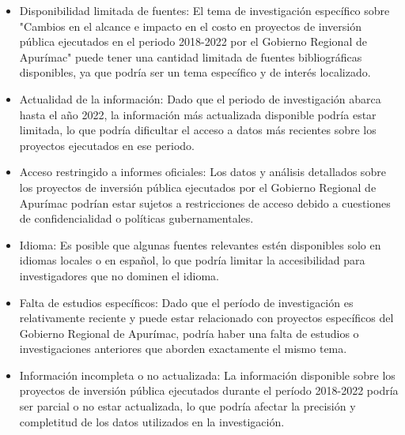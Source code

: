 \begin{itemize}
	\item Disponibilidad limitada de fuentes: El tema de investigación específico sobre "Cambios en el alcance e impacto en el costo en proyectos de inversión pública ejecutados en el periodo 2018-2022 por el Gobierno Regional de Apurímac" puede tener una cantidad limitada de fuentes bibliográficas disponibles, ya que podría ser un tema específico y de interés localizado.
	\item Actualidad de la información: Dado que el periodo de investigación abarca hasta el año 2022, la información más actualizada disponible podría estar limitada, lo que podría dificultar el acceso a datos más recientes sobre los proyectos ejecutados en ese periodo.
	\item Acceso restringido a informes oficiales: Los datos y análisis detallados sobre los proyectos de inversión pública ejecutados por el Gobierno Regional de Apurímac podrían estar sujetos a restricciones de acceso debido a cuestiones de confidencialidad o políticas gubernamentales.
	\item Idioma: Es posible que algunas fuentes relevantes estén disponibles solo en idiomas locales o en español, lo que podría limitar la accesibilidad para investigadores que no dominen el idioma.
	\item Falta de estudios específicos: Dado que el período de investigación es relativamente reciente y puede estar relacionado con proyectos específicos del Gobierno Regional de Apurímac, podría haber una falta de estudios o investigaciones anteriores que aborden exactamente el mismo tema.
	\item Información incompleta o no actualizada: La información disponible sobre los proyectos de inversión pública ejecutados durante el período 2018-2022 podría ser parcial o no estar actualizada, lo que podría afectar la precisión y completitud de los datos utilizados en la investigación.
\end{itemize}


